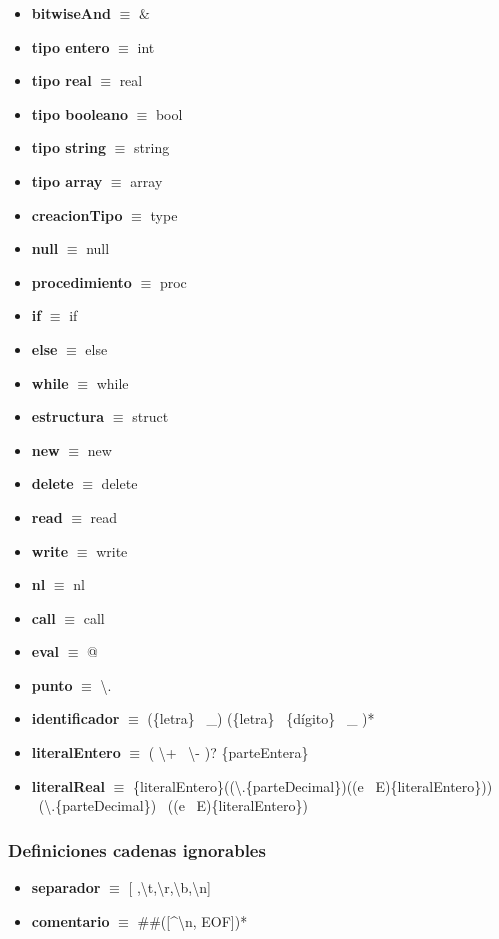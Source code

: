 \documentclass[11pt]{article}
\begin{document}
\begin{itemize}
            \item \textbf{bitwiseAnd }$\equiv$ $\&$
            \item \textbf{tipo entero }$\equiv$ int
            \item \textbf{tipo real }$\equiv$ real
            \item \textbf{tipo booleano }$\equiv$ bool
            \item \textbf{tipo string }$\equiv$ string
            \item \textbf{tipo array }$\equiv$ array
            \item \textbf{creacionTipo }$\equiv$ type
            \item \textbf{null }$\equiv$ null
            \item \textbf{procedimiento }$\equiv$ proc
            \item \textbf{if }$\equiv$ if
            \item \textbf{else }$\equiv$ else
            \item \textbf{while }$\equiv$ while
            \item \textbf{estructura }$\equiv$ struct
            \item \textbf{new }$\equiv$ new
            \item \textbf{delete }$\equiv$ delete
            \item \textbf{read }$\equiv$ read
            \item \textbf{write }$\equiv$ write
            \item \textbf{nl }$\equiv$ nl
            \item \textbf{call }$\equiv$ call
            \item \textbf{eval }$\equiv$ @
            \item \textbf{punto }$\equiv$ \textbackslash.
            \item \textbf{identificador }$\equiv$ (\{letra\} \textbar\ \_) (\{letra\} \textbar\ \{dígito\} \textbar\ \_ )*
            \item \textbf{literalEntero }$\equiv$ ( \textbackslash + \textbar\ \textbackslash - )? \{parteEntera\}
            \item \textbf{literalReal }  $\equiv$ \{literalEntero\}((\textbackslash.\{parteDecimal\})((e \textbar\ E)\{literalEntero\})) \textbar\ (\textbackslash.\{parteDecimal\}) \textbar\ ((e \textbar\ E)\{literalEntero\})
        \end{itemize}
        \subsubsection*{Definiciones cadenas ignorables}
        \begin{itemize}
            \item \textbf{separador }$\equiv$ [ ,\textbackslash t,\textbackslash r,\textbackslash b,\textbackslash n]
            \item \textbf{comentario }$\equiv$ \#\#([\^{}\textbackslash n, EOF])*
        \end{itemize}
\end{document}

